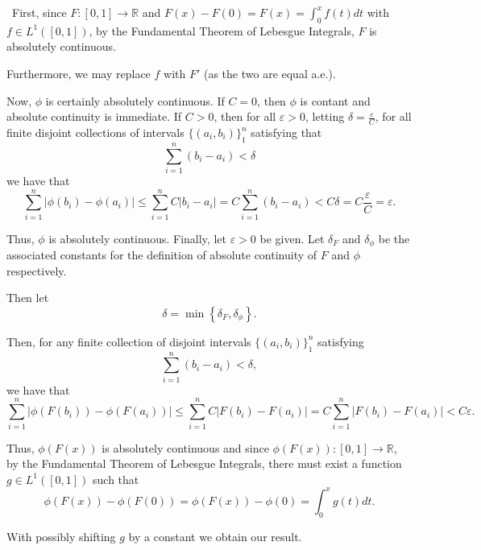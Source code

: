\documentclass[12pt]{Homework}
\begin{document}
\begin{solution}$\,$
First, since $F:[0,1]\to\mathbb{R}$ and $F(x)-F(0)=F(x)=\int_0^xf(t)dt$ with $f\in L^1([0,1])$, by the Fundamental Theorem of Lebesgue Integrals, $F$ is absolutely continuous. 

Furthermore, we may replace $f$ with $F'$ (as the two are equal a.e.). 

Now, $\phi$ is certainly absolutely continuous. If $C=0$, then $\phi$ is contant and absolute continuity is immediate. If $C>0$, then for all $\varepsilon>0$, letting $\delta=\frac{\varepsilon}{C}$, for all finite disjoint collections of intervals $\{(a_i,b_i)\}_1^n$ satisfying that $$\sum_{i=1}^n(b_i-a_i)<\delta$$ we have that $$\sum_{i=1}^n|\phi(b_i)-\phi(a_i)|\le\sum_{i=1}^nC|b_i-a_i|=C\sum_{i=1}^n(b_i-a_i)<C\delta=C\frac{\varepsilon}{C}=\varepsilon.$$

Thus, $\phi$ is absolutely continuous. Finally, let $\varepsilon>0$ be given. Let $\delta_F$ and $\delta_\phi$ be the associated constants for the definition of absolute continuity of $F$ and $\phi$ respectively. 

Then let $$\delta=\min\left\{\delta_F,\delta_\phi\right\}.$$

Then, for any finite collection of disjoint intervals $\{(a_i,b_i)\}_1^n$ satisfying $$\sum_{i=1}^n(b_i-a_i)<\delta,$$ we have that $$\sum_{i=1}^n|\phi(F(b_i))-\phi(F(a_i))|\le\sum_{i=1}^nC|F(b_i)-F(a_i)|=C\sum_{i=1}^n|F(b_i)-F(a_i)|<C\varepsilon.$$

Thus, $\phi(F(x))$ is absolutely continuous and since $\phi(F(x)):[0,1]\to\mathbb{R}$, by the Fundamental Theorem of Lebesgue Integrals, there must exist a function $g\in L^1([0,1])$ such that $$\phi(F(x))-\phi(F(0))=\phi(F(x))-\phi(0)=\int_0^xg(t)dt.$$

With possibly shifting $g$ by a constant we obtain our result. 
\end{solution}
\vspace{0.5cm}
\end{document}
